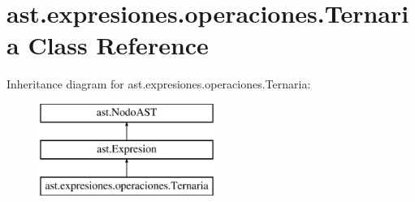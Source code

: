\hypertarget{classast_1_1expresiones_1_1operaciones_1_1_ternaria}{}\section{ast.\+expresiones.\+operaciones.\+Ternaria Class Reference}
\label{classast_1_1expresiones_1_1operaciones_1_1_ternaria}
Inheritance diagram for ast.\+expresiones.\+operaciones.\+Ternaria\+:\begin{figure}[H]
\begin{center}
\leavevmode
\includegraphics[height=3.000000cm]{classast_1_1expresiones_1_1operaciones_1_1_ternaria}
\end{center}
\end{figure}
